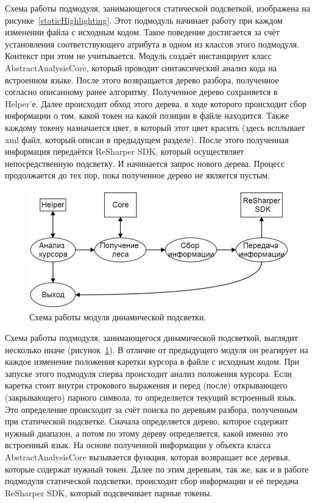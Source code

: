 Схема работы подмодуля, занимающегося статической подсветкой, изображена на рисунке~\ref{staticHighlighting}. Этот подмодуль начинает работу при каждом изменении файла с исходным кодом. Такое поведение достигается за счёт установления соответствующего атрибута в одном из классов этого подмодуля. Контекст при этом не учитывается. Модуль создаёт инстанцирует класс AbstractAnalysisCore, который проводит синтаксический анализ кода на встроенном языке. После этого возвращается дерево разбора, полученное согласно описанному ранее алгоритму. Полученное дерево сохраняется в Helper’е. Далее происходит обход этого дерева, в ходе которого происходит сбор информации о том, какой токен на какой позиции в файле находится. Также каждому токену назначается цвет, в который этот цвет красить (здесь всплывает xml файл, который описан в предыдущем разделе). После этого полученная информация передаётся ReSharper SDK, который осуществляет непосредственную подсветку. И начинается запрос нового дерева. Процесс продолжается до тех пор, пока полученное дерево не является пустым.

\begin{figure}[t]
\centering
\includegraphics[width=\linewidth]{Ivanov/Pictures/dynamicHighlighting.png}
\caption{Схема работы модуля динамической подсветки.}
\label{dynamicHighlighting}
\end{figure}

Схема работы подмодуля, занимающегося динамической подсветкой, выглядит несколько иначе (рисунок~\ref{dynamicHighlighting}). В отличие от предыдущего модуля он реагирует на каждое изменение положения каретки курсора в файле с исходным кодом. При запуске этого подмодуля сперва происходит анализ положения курсора. Если каретка стоит внутри строкового выражения и перед (после) открывающего (закрывающего) парного символа, то определяется текущий встроенный язык. Это определение происходит за счёт поиска по деревьям разбора, полученным при статической подсветке. Сначала определяется дерево, которое содержит нужный диапазон, а потом по этому дереву определяется, какой именно это встроенный язык. На основе полученной информации у объекта класса AbstractAnalysisCore вызывается функция, которая возвращает все деревья, которые содержат нужный токен. Далее по этим деревьям, так же, как и в работе подмодуля статической подсветки, происходит сбор информации и её передача ReSharper SDK, который подсвечивает парные токены. 

